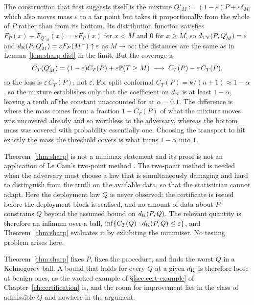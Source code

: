 \documentclass[../../../main.tex]{subfiles}
\begin{document}
\begin{remark}\label{rem:sharp-mixture}
The construction that first suggests itself is the mixture $Q'_M:=(1-\varepsilon)P+\varepsilon\delta_M$, which also moves mass $\varepsilon$ to a far point but takes it proportionally from the whole of $P$ rather than from its bottom. Its distribution function satisfies $F_P(x)-F_{Q'_M}(x)=\varepsilon F_P(x)$ for $x<M$ and $0$ for $x\ge M$, so $d_{\mathrm{TV}}(P,Q'_M)=\varepsilon$ and $d_{\mathrm{K}}(P,Q'_M)=\varepsilon F_P(M^-)\uparrow\varepsilon$ as $M\to\infty$: the distances are the same as in Lemma~\ref{lem:sharp-dist} in the limit. But the coverage is
\[
C_T(Q'_M)=(1-\varepsilon)C_T(P)+\varepsilon\mathbb{P}(T\ge M)\;\longrightarrow\;C_T(P)-\varepsilon\,C_T(P),
\]
so the loss is $\varepsilon\,C_T(P)$, not $\varepsilon$. For split conformal $C_T(P)=k/(n+1)\approx1-\alpha$, so the mixture establishes only that the coefficient on $d_{\mathrm{K}}$ is at least $1-\alpha$, leaving a tenth of the constant unaccounted for at $\alpha=0.1$. The difference is where the mass comes from: a fraction $1-C_T(P)$ of what the mixture moves was uncovered already and so worthless to the adversary, whereas the bottom mass was covered with probability essentially one. Choosing the transport to hit exactly the mass the threshold covers is what turns $1-\alpha$ into $1$.
\end{remark}

\begin{remark}\label{rem:sharp-lecam}
Theorem~\ref{thm:sharp} is not a minimax statement and its proof is not an application of Le Cam's two-point method \citep[\S2.3, pp.~81--83]{tsybakov2009}. The two-point method is needed when the adversary must choose a law that is simultaneously damaging and hard to distinguish from the truth on the available data, so that the statistician cannot adapt. Here the deployment law $Q$ is never observed: the certificate is issued before the deployment block is realised, and no amount of data about $P$ constrains $Q$ beyond the assumed bound on $d_{\mathrm{K}}(P,Q)$. The relevant quantity is therefore an infimum over a ball, $\inf\{C_T(Q):d_{\mathrm{K}}(P,Q)\le\varepsilon\}$, and Theorem~\ref{thm:sharp} evaluates it by exhibiting the minimiser. No testing problem arises here.
\end{remark}

\begin{remark}\label{rem:sharp-scope}
Theorem~\ref{thm:sharp} fixes $P$, fixes the procedure, and finds the worst $Q$ in a Kolmogorov ball. A bound that holds for every $Q$ at a given $d_{\mathrm{K}}$ is therefore loose at benign ones, as the worked example of \S\ref{sec:cert-example} of Chapter~\ref{ch:certification} is, and the room for improvement lies in the class of admissible $Q$ and nowhere in the argument.
\end{remark}
\end{document}
